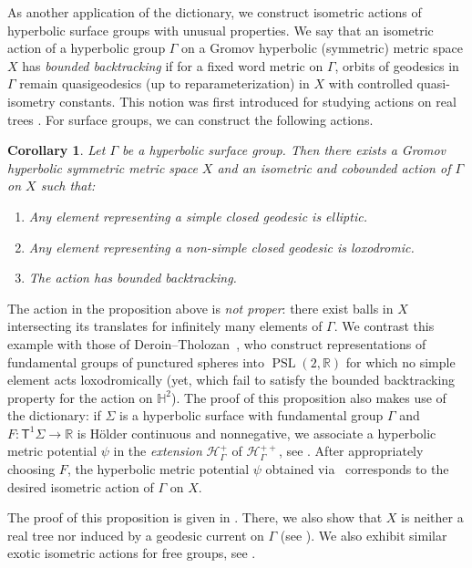 \documentclass[twoside]{amsart}
\newtheorem{corollarymain}[mainthm]{Corollary}
\theoremstyle{definition}
\numberwithin{equation}{section}
\numberwithin{theorem}{section}
\newcommand{\msf}[1]{\mathsf{#1}}
\newcommand{\Hy}{\mathbb{H}}
\newcommand{\R}{\mathbb{R}}
\newcommand{\calH}{\mathcal{H}}
\newcommand{\G}{\Gamma}
\newcommand{\Sig}{\Sigma}
\newcommand{\p}{\psi}
\DeclareMathOperator{\PSL}{PSL}
\newcommand{\ra}{\rightarrow}
\begin{document}
As another application of the dictionary, we construct isometric actions of hyperbolic surface groups with unusual properties. We say that an isometric action of a hyperbolic group $\Gamma$ on a Gromov hyperbolic (symmetric) metric space $X$ has \emph{bounded backtracking} if for a fixed word metric on $\G$, orbits of geodesics in $\G$ remain quasigeodesics (up to reparameterization) in $X$ with controlled quasi-isometry constants. This notion was first introduced for studying actions on real trees \cite{GJLL}. For surface groups, we can construct the following actions.

\begin{corollarymain}\label{maincor:positiveonnonsimpleintro}
    Let $\G$ be a hyperbolic surface group. Then there exists a Gromov hyperbolic symmetric metric space $X$ and an isometric and cobounded action of $\G$ on $X$ such that:
    \begin{enumerate}
        \item Any element representing a simple closed geodesic is elliptic.
        \item Any element representing a non-simple closed geodesic is loxodromic.
        \item The action has bounded backtracking.
\end{enumerate}
\end{corollarymain}
The action in the proposition above is \emph{not proper}: there exist balls in $X$ intersecting its translates for infinitely many elements of $\G$. We contrast this example with those of Deroin--Tholozan~\cite{deroin-tholozan}, who construct representations of fundamental groups of punctured spheres into $\PSL(2,\R)$ for which no simple element acts loxodromically (yet, which fail to satisfy the bounded backtracking property for the action on $\Hy^2$). The proof of this proposition also makes use of the dictionary: if $\Sig$ is a hyperbolic surface with fundamental group $\G$ and $F:\msf{T}^1 \Sig \ra \R$ is H\"older continuous and nonnegative, we associate a hyperbolic metric potential $\p$ in the \emph{extension} $\calH^{+}_\G$ of $\calH_\G^{++}$, see
. After appropriately choosing $F$, the hyperbolic metric potential $\p$ obtained via~ corresponds to the desired isometric action of $\G$ on $X$.

The proof of this proposition is given in . There, we also show that $X$ is neither a real tree nor induced by a geodesic current on $\Gamma$ (see ). We also exhibit similar exotic isometric actions for free groups, see .
\end{document}
